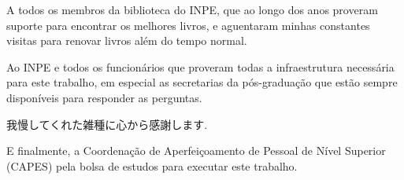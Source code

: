 \begin{agradecimentos}
A todos os membros da biblioteca do INPE, que ao longo dos anos proveram suporte para encontrar os melhores livros, e aguentaram minhas constantes visitas para renovar livros além do tempo normal.

Ao INPE e todos os funcionários que proveram todas a infraestrutura necessária para este trabalho, em especial as secretarias da pós-graduação que estão sempre disponíveis para responder as perguntas.

\begin{CJK}{UTF8}{min}
  我慢してくれた雑種に心から感謝します.
\end{CJK}

E finalmente, a Coordenação de Aperfeiçoamento de Pessoal de Nível Superior (CAPES) pela bolsa de estudos para executar este trabalho.

\end{agradecimentos}


